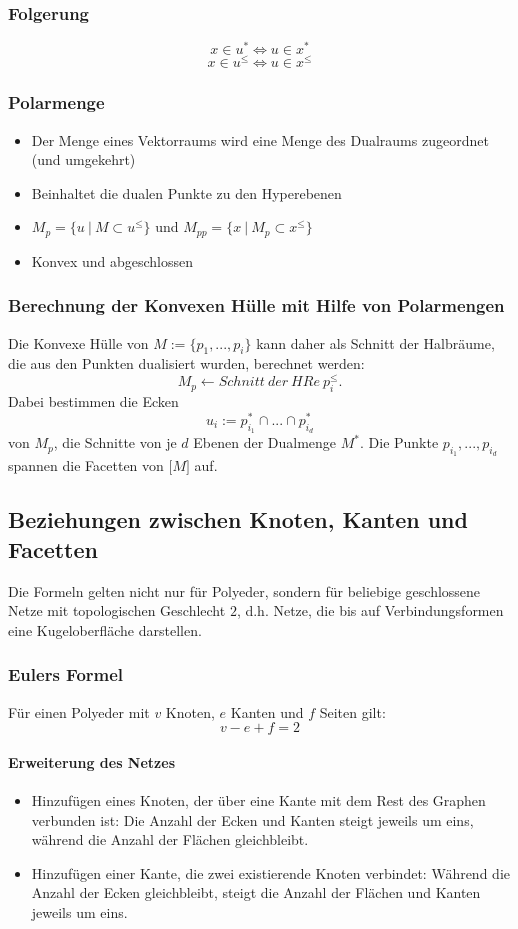 \subsubsection{Folgerung}
\[x \in u^* \Leftrightarrow u \in x^*\]
\[x \in u^{\leq} \Leftrightarrow u \in x^{\leq}\]

\subsubsection{Polarmenge}
\begin{itemize}
	\item Der Menge eines Vektorraums wird eine Menge des Dualraums zugeordnet (und umgekehrt)
	\item Beinhaltet die dualen Punkte zu den Hyperebenen
	\item \(M_p = \{u~|~M \subset u^{\leq}\}\) und \(M_{pp} = \{x~|~M_p \subset x^{\leq}\}\)
	\item Konvex und abgeschlossen
\end{itemize}

\subsubsection{Berechnung der Konvexen Hülle mit Hilfe von Polarmengen}
Die Konvexe Hülle von \(M := \{p_1,...,p_i\}\) kann daher als Schnitt der Halbräume, die aus den Punkten dualisiert wurden, berechnet werden:
\[M_p \longleftarrow Schnitt~der~HRe~p_i^{\leq}.\]
Dabei bestimmen die Ecken
\[u_i := p_{i_1}^* \cap ... \cap p_{i_d}^*\]
von \(M_p\), die Schnitte von je \(d\) Ebenen der Dualmenge \(M^*\). Die Punkte \(p_{i_1},...,p_{i_d}\) spannen die Facetten von \(\lbrack M \rbrack\) auf.


\subsection{Beziehungen zwischen Knoten, Kanten und Facetten}
Die Formeln gelten nicht nur für Polyeder, sondern für beliebige geschlossene Netze mit topologischen Geschlecht \(2\), d.h. Netze, die bis auf Verbindungsformen eine Kugeloberfläche darstellen.

\subsubsection{Eulers Formel}
Für einen Polyeder mit \(v\) Knoten, \(e\) Kanten und \(f\) Seiten gilt:
\[v-e+f=2\]

\paragraph{Erweiterung des Netzes}
\begin{itemize}
	\item Hinzufügen eines Knoten, der über eine Kante mit dem Rest des Graphen verbunden ist: Die Anzahl der Ecken und Kanten steigt jeweils um eins, während die Anzahl der Flächen gleichbleibt.
	\item Hinzufügen einer Kante, die zwei existierende Knoten verbindet: Während die Anzahl der Ecken gleichbleibt, steigt die Anzahl der Flächen und Kanten jeweils um eins. 
\end{itemize}

